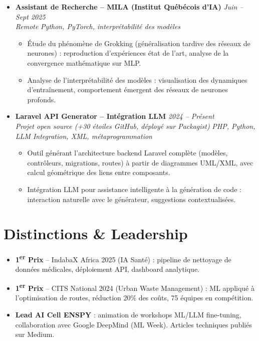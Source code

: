 \documentclass[a4paper,11pt]{article}
\begin{document}
\begin{itemize}[leftmargin=*, label={-}]
\item \textbf{Assistant de Recherche -- MILA (Institut Québécois d'IA)} \hfill \textit{Juin -- Sept 2025} \\
\textit{Remote} \hfill \textit{Python, PyTorch, interprétabilité des modèles}
\vspace{-2pt}
    \begin{itemize}[leftmargin=0.4cm, nosep, label=\tiny$\bullet$]
        \item \small{Étude du phénomène de Grokking (généralisation tardive des réseaux de neurones) : reproduction d'expériences état de l'art, analyse de la convergence mathématique sur MLP.}
        \item \small{Analyse de l'interprétabilité des modèles : visualisation des dynamiques d'entraînement, comportement émergent des réseaux de neurones profonds.}
    \end{itemize}
\vspace{3pt}

\item \textbf{Laravel API Generator -- Intégration LLM} \hfill \textit{2024 -- Présent} \\
\textit{Projet open source (+30 étoiles GitHub, déployé sur Packagist)} \hfill \textit{PHP, Python, LLM Integration, XML, métaprogrammation}
\vspace{-2pt}
    \begin{itemize}[leftmargin=0.4cm, nosep, label=\tiny$\bullet$]
        \item \small{Outil générant l'architecture backend Laravel complète (modèles, contrôleurs, migrations, routes) à partir de diagrammes UML/XML, avec calcul géométrique des liens entre composants.}
        \item \small{Intégration LLM pour assistance intelligente à la génération de code : interaction naturelle avec le générateur, suggestions contextualisées.}
    \end{itemize}
\vspace{3pt}

\end{itemize}

\section{Distinctions \& Leadership}
\begin{itemize}[leftmargin=*, nosep, label=\tiny$\bullet$]
    \item \small{\textbf{1\textsuperscript{er} Prix} -- IndabaX Africa 2025 (IA Santé) : pipeline de nettoyage de données médicales, déploiement API, dashboard analytique.}
    \item \small{\textbf{1\textsuperscript{er} Prix} -- CITS National 2024 (Urban Waste Management) : ML appliqué à l'optimisation de routes, réduction 20\% des coûts, 75 équipes en compétition.}
    \item \small{\textbf{Lead AI Cell ENSPY} : animation de workshops ML/LLM fine-tuning, collaboration avec Google DeepMind (ML Week). Articles techniques publiés sur Medium.}
\end{itemize}
\end{document}
